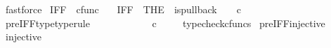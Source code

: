 \begin{isabellebody}
\ fastforce%
\endisatagproof
{\isafoldproof}%
%
\isadelimproof
%
\endisadelimproof
%
\isadelimdocument
%
\endisadelimdocument
%
\isatagdocument
%
\isamarkuptrue%
%
\endisatagdocument
{\isafolddocument}%
%
\isadelimdocument
%
\endisadelimdocument
{}\isamarkupfalse%
\ IFF\ {\isacharcolon}{\kern0pt}{\isacharcolon}{\kern0pt}\ {\isachardoublequoteopen}cfunc{\isachardoublequoteclose}\ \isanewline
\ \ {\isachardoublequoteopen}IFF\ {\isacharequal}{\kern0pt}\ {\isacharparenleft}{\kern0pt}THE\ {\isasymchi}{\isachardot}{\kern0pt}\ is{\isacharunderscore}{\kern0pt}pullback\ {\isacharparenleft}{\kern0pt}{\isasymone}{\isasymCoprod}{\isasymone}{\isacharparenright}{\kern0pt}\ {\isasymone}\ {\isacharparenleft}{\kern0pt}{\isasymOmega}\ {\isasymtimes}\isactrlsub c\ {\isasymOmega}{\isacharparenright}{\kern0pt}\ {\isasymOmega}\ {\isacharparenleft}{\kern0pt}{\isasymbeta}\isactrlbsub {\isacharparenleft}{\kern0pt}{\isasymone}{\isasymCoprod}{\isasymone}{\isacharparenright}{\kern0pt}\isactrlesub {\isacharparenright}{\kern0pt}\ {\isasymt}\ {\isacharparenleft}{\kern0pt}{\isasymlangle}{\isasymt}{\isacharcomma}{\kern0pt}\ {\isasymt}{\isasymrangle}\ {\isasymamalg}{\isasymlangle}{\isasymf}{\isacharcomma}{\kern0pt}\ {\isasymf}{\isasymrangle}{\isacharparenright}{\kern0pt}\ {\isasymchi}{\isacharparenright}{\kern0pt}{\isachardoublequoteclose}\isanewline
\isanewline
{}\isamarkupfalse%
\ pre{\isacharunderscore}{\kern0pt}IFF{\isacharunderscore}{\kern0pt}type{\isacharbrackleft}{\kern0pt}type{\isacharunderscore}{\kern0pt}rule{\isacharbrackright}{\kern0pt}{\isacharcolon}{\kern0pt}\ \isanewline
\ \ {\isachardoublequoteopen}{\isasymlangle}{\isasymt}{\isacharcomma}{\kern0pt}\ {\isasymt}{\isasymrangle}\ {\isasymamalg}\ {\isasymlangle}{\isasymf}{\isacharcomma}{\kern0pt}\ {\isasymf}{\isasymrangle}\ {\isacharcolon}{\kern0pt}\ {\isasymone}{\isasymCoprod}{\isasymone}\ {\isasymrightarrow}\ {\isasymOmega}\ {\isasymtimes}\isactrlsub c\ {\isasymOmega}{\isachardoublequoteclose}\isanewline
%
\isadelimproof
\ \ %
\endisadelimproof
%
\isatagproof
{}\isamarkupfalse%
\ typecheck{\isacharunderscore}{\kern0pt}cfuncs%
\endisatagproof
{\isafoldproof}%
%
\isadelimproof
\isanewline
%
\endisadelimproof
\isanewline
{}\isamarkupfalse%
\ pre{\isacharunderscore}{\kern0pt}IFF{\isacharunderscore}{\kern0pt}injective{\isacharcolon}{\kern0pt}\isanewline
\ {\isachardoublequoteopen}injective{\isacharparenleft}{\kern0pt}{\isasymlangle}{\isasymt}{\isacharcomma}{\kern0pt}\ {\isasymt}{\isasymrangle}\ {\isasymamalg}{\isasymlangle}{\isasymf}{\isacharcomma}{\kern0pt}\ {\isasymf}{\isasymrangle}{\isacharparenright}{\kern0pt}{\isachardoublequoteclose}\isanewline

\end{isabellebody}
